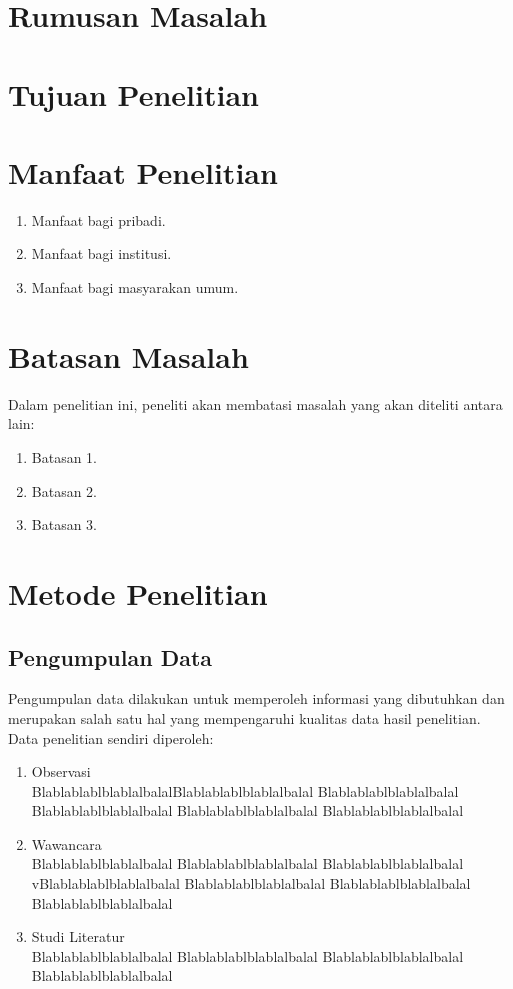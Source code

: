 \section{Rumusan Masalah}

\section{Tujuan Penelitian}

\section{Manfaat Penelitian}
\begin{enumerate}[nolistsep,leftmargin=0.5cm]
\item Manfaat bagi pribadi.
\item Manfaat bagi institusi.
\item Manfaat bagi masyarakan umum.
\end{enumerate}

\section{Batasan Masalah}
Dalam penelitian ini, peneliti akan membatasi masalah yang akan diteliti antara lain:
\begin{enumerate}[nolistsep,leftmargin=0.5cm]
\item Batasan 1.
\item Batasan 2.
\item Batasan 3.
\end{enumerate}


\section{Metode Penelitian}

\subsection{Pengumpulan Data}
Pengumpulan data dilakukan untuk memperoleh informasi yang
dibutuhkan dan merupakan salah satu hal yang mempengaruhi kualitas data hasil penelitian. Data penelitian sendiri diperoleh:
\begin{enumerate}[nolistsep,leftmargin=0.5cm]
\item Observasi \\
BlablablablblablalbalalBlablablablblablalbalal Blablablablblablalbalal Blablablablblablalbalal Blablablablblablalbalal Blablablablblablalbalal
\item Wawancara \\
Blablablablblablalbalal Blablablablblablalbalal Blablablablblablalbalal vBlablablablblablalbalal Blablablablblablalbalal Blablablablblablalbalal Blablablablblablalbalal
\item Studi Literatur \\
Blablablablblablalbalal Blablablablblablalbalal Blablablablblablalbalal Blablablablblablalbalal
\end{enumerate}

